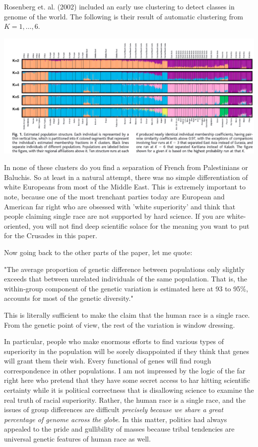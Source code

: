 \documentclass{amsart}
\begin{document}
Rosenberg et. al. (2002) \cite{Ros02} included an early use clustering to detect classes in genome of the world.  The following is their result of automatic clustering from $K=1,\dots, 6$.

\includegraphics[scale=0.3]{clusterpop.png}

In none of these clusters do you find a separation of French from Palestinians or Baluchis.  So at least in a natural attempt, there was no simple differentiation of white Europeans from most of the Middle East.  This is extremely important to note, because one of the most trenchant parties today are European and American far right who are obsessed with 'white superiority' and think that people claiming single race are not supported by hard science.  If you are white-oriented, you will not find deep scientific solace for the meaning you want to put for the Crusades in this paper.

Now going back to the other parts of the paper, let me quote: 

"The average proportion of genetic difference between populations only slightly exceeds that between unrelated individuals of the same population.  That is, the within-group component of the genetic variation is estimated here at 93 to 95\%, accounts for most of the genetic diversity."

This is literally sufficient to make the claim that the human race is a single race.  From the genetic point of view, the rest of the variation is window dressing.  

In particular, people who make enormous efforts to find various types of superiority in the population will be sorely disappointed if they think that genes will grant them their wish.  Every functional of genes will find rough correspondence in other populations.  I am not impressed by the logic of the far right here who pretend that they have some secret access to har hitting scientific certainty while it is political correctness that is disallowing science to examine the real truth of racial superiority.  Rather, the human race is a single race, and the issues of group differences are difficult {\em precisely because we share a great percentage of genome across the globe}.  In this matter, politics had always appealed to the pride and gullibility of masses because tribal tendencies are universal genetic features of human race as well.
\end{document}
